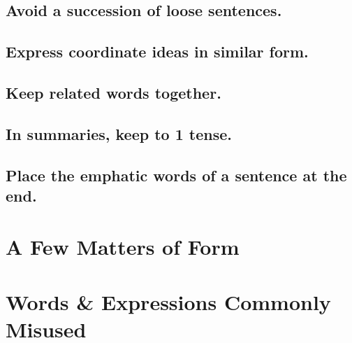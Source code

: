 \documentclass{article}
\numberwithin{equation}{section}
\begin{document}

\subsection{Avoid a succession of loose sentences.}


\subsection{Express coordinate ideas in similar form.}


\subsection{Keep related words together.}


\subsection{In summaries, keep to 1 tense.}


\subsection{Place the emphatic words of a sentence at the end.}


\section{A Few Matters of Form}


\section{Words \& Expressions Commonly Misused}

\end{document}
